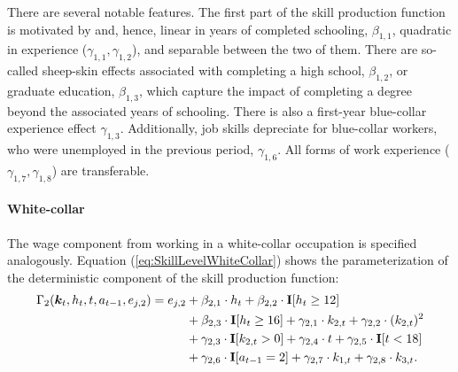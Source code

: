 \noindent There are several notable features. The first part of the skill production function is motivated by  and, hence, linear in years of completed schooling, $\beta_{1,1}$, quadratic in experience ($\gamma_{1,1}, \gamma_{1,2}$), and separable between the two of them. There are so-called sheep-skin effects  associated with completing a high school, $\beta_{1,2}$, or graduate education, $\beta_{1,3}$, which capture the impact of completing a degree beyond the associated years of schooling. There is also a first-year blue-collar experience effect $\gamma_{1,3}$. Additionally, job skills depreciate for blue-collar workers, who were unemployed in the previous period, $\gamma_{1,6}$. All forms of work experience ($\gamma_{1,7}, \gamma_{1,8}$) are transferable.
\paragraph{White-collar}
The wage component from working in a white-collar occupation is specified analogously. Equation (\ref{eq:SkillLevelWhiteCollar}) shows the parameterization of the deterministic component of the skill production function:
%
\begin{align}\label{eq:SkillLevelWhiteCollar}
    \Gamma_2(\bm{k}_t, h_t, t, a_{t-1}, e_{j,2}) = e_{j,2} & + \beta_{2,1} \cdot h_t + \beta_{2, 2} \cdot {\textbf{I}}[h_t \geq 12]  \\\nonumber
    							 & + \beta_{2,3} \cdot {\textbf{I}}[h_t\geq 16]+ \gamma_{2, 1} \cdot  k_{2,t} + \gamma_{2,2} \cdot  (k_{2,t})^2  \\\nonumber
                                   & + \gamma_{2,3} \cdot  {\textbf{I}}[k_{2,t} > 0]+ \gamma_{2,4} \cdot  t + \gamma_{2,5} \cdot {\textbf{I}}[t < 18] \\\nonumber
                                  & + \gamma_{2,6} \cdot  {\textbf{I}}[a_{t-1} = 2]  + \gamma_{2,7} \cdot  k_{1,t} + \gamma_{2,8} \cdot  k_{3,t}.
\end{align}
